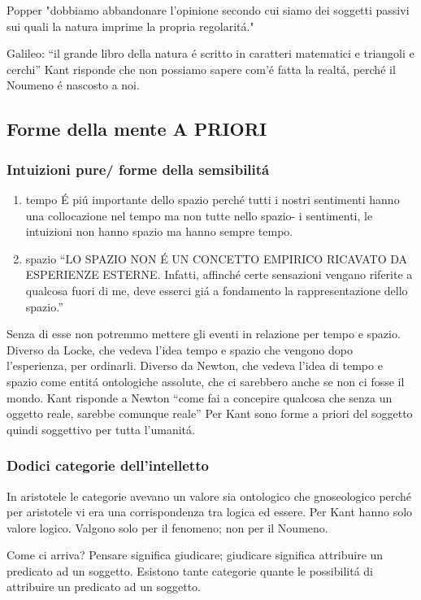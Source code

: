 \documentclass{article}
\begin{document}
Popper "dobbiamo abbandonare l'opinione secondo cui siamo dei soggetti passivi sui quali la natura imprime la propria regolaritá."

Galileo: ``il grande libro della natura é scritto in caratteri matematici e triangoli e cerchi'' Kant risponde che non possiamo sapere com'é fatta la realtá, perché il Noumeno é nascosto a noi.
\subsection{Forme della mente A PRIORI}
\subsubsection{Intuizioni pure/ forme della semsibilitá}
\begin{enumerate}
    \item tempo
    É piú importante dello spazio perché tutti i nostri sentimenti hanno una collocazione nel tempo ma non tutte nello spazio- i sentimenti, le intuizioni non hanno spazio ma hanno sempre tempo.
    \item spazio
    ``LO SPAZIO NON É UN CONCETTO EMPIRICO RICAVATO DA ESPERIENZE ESTERNE. Infatti, affinché certe sensazioni vengano riferite a qualcosa fuori di me, deve esserci giá a fondamento la rappresentazione dello spazio.''
\end{enumerate}
Senza di esse non potremmo mettere gli eventi in relazione per tempo e spazio. Diverso da Locke, che vedeva l'idea tempo e spazio che vengono dopo l'esperienza, per ordinarli. Diverso da Newton, che vedeva l'idea di tempo e spazio come entitá ontologiche assolute, che ci sarebbero anche se non ci fosse il mondo. Kant risponde a Newton ``come fai a concepire qualcosa che senza un oggetto reale, sarebbe comunque reale'' Per Kant sono forme a priori del soggetto quindi soggettivo per tutta l'umanitá.
\subsubsection{Dodici categorie dell'intelletto}
In aristotele le categorie avevano un valore sia ontologico che gnoseologico perché per aristotele vi era una corrispondenza tra logica ed essere. Per Kant hanno solo valore logico. Valgono solo per il fenomeno; non per il Noumeno.

Come ci arriva? Pensare significa giudicare; giudicare significa attribuire un predicato ad un soggetto. Esistono tante categorie quante le possibilitá di attribuire un predicato ad un soggetto.
\end{document}
